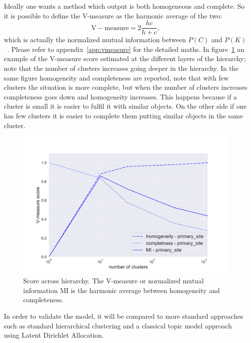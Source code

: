 Ideally one wants a method which output is both homogeneous and complete. So it is possible to define the V-measure as the harmonic average of the two:
\begin{equation}\label{eq:mutualinformation}
    \mathrm{V-measure}=2\frac{h c}{h + c},
\end{equation}
which is actually the normalized mutual information between $P(C)$ and $P(K)$~\cite{rosenberg2007v}. Please refer to appendix~\ref{app:vmeasure} for the detailed maths. In figure~\ref{fig:topic/metric_scores_primarysite} an example of the V-measure score estimated at the different layers of the hierarchy; note that the number of clusters increases going deeper in the hierarchy. In the same figure homogeneity and completeness are reported, note that with few clusters the situation is more complete, but when the number of clusters increases completeness goes down and homogeneity increases. This happens because if a cluster is small it is easier to fulfil it with similar objects. On the other side if one has few clusters it is easier to complete them putting similar objects in the same cluster.
\begin{figure}[htb!]
    \centering
    \includegraphics[width=0.8\linewidth]{pictures/topic/gtex/oversigma_10tissue/metric_scores_primarysite.pdf}
    \caption{Score across hierarchy. The V-measure or normalized mutual information MI is the harmonic average between homogeneity and completeness.}
    \label{fig:topic/metric_scores_primarysite}
\end{figure}

In order to validate the model, it will be compared to more standard approaches such as standard hierarchical clustering and a classical topic model approach using Latent Dirichlet Allocation. 
\FloatBarrier